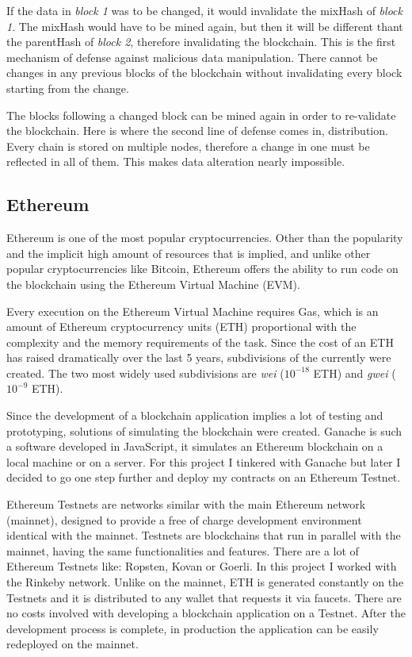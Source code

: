 \documentclass[a4paper,12pt]{report}
\begin{document}
If the data in \textit{block 1} was to be changed, it would invalidate the
mixHash of \textit{block 1}. The mixHash would have to be mined again, but then
it will be different thant the parentHash of \textit{block 2}, therefore
invalidating the blockchain. This is the first mechanism of defense against
malicious data manipulation. There cannot be changes in any previous blocks of
the blockchain without invalidating every block starting from the change.

The blocks following a changed block can be mined again in order to re-validate
the blockchain. Here is where the second line of defense comes in,
distribution. Every chain is stored on multiple nodes, therefore a change in
one must be reflected in all of them. This makes data alteration nearly
impossible.

\subsection{Ethereum}

Ethereum is one of the most popular cryptocurrencies. Other than the popularity
and the implicit high amount of resources that is implied, and unlike other
popular cryptocurrencies like Bitcoin, Ethereum offers the ability to run code
on the blockchain using the Ethereum Virtual Machine (EVM)\cite{ethereumDocs}.

Every execution on the Ethereum Virtual Machine requires Gas, which is an
amount of Ethereum cryptocurrency units (ETH) proportional with the complexity
and the memory requirements of the task. Since the cost of an ETH has raised
dramatically over the last 5 years, subdivisions of the currently were created.
The two most widely used subdivisions are \textit{wei} (\(10^{-18}\) ETH) and
\textit{gwei} (\(10^{-9}\) ETH).

Since the development of a blockchain application implies a lot of testing and
prototyping, solutions of simulating the blockchain were created. Ganache is
such a software developed in JavaScript, it simulates an Ethereum blockchain on
a local machine or on a server. For this project I tinkered with Ganache but
later I decided to go one step further and deploy my contracts on an Ethereum
Testnet.

Ethereum Testnets are networks similar with the main Ethereum network
(mainnet), designed to provide a free of charge development environment
identical with the mainnet. Testnets are blockchains that run in parallel with
the mainnet, having the same functionalities and features. There are a lot of
Ethereum Testnets like: Ropsten, Kovan or Goerli. In this project I worked with
the Rinkeby network. Unlike on the mainnet, ETH is generated constantly on the
Testnets and it is distributed to any wallet that requests it via faucets.
There are no costs involved with developing a blockchain application on a
Testnet. After the development process is complete, in production the
application can be easily redeployed on the mainnet.
\end{document}
